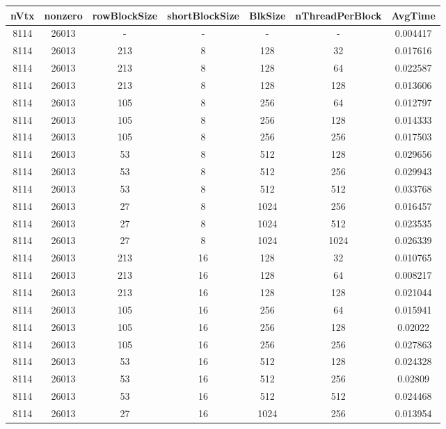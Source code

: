 \documentclass[9pt]{article}
\begin{document}
\SetBgPosition{0.25cm,-5.0cm}
\begin{tabular}{|c|c|c|c|c|c|c| }  
\hline
nVtx  & nonzero  & rowBlockSize  & shortBlockSize  & BlkSize  & nThreadPerBlock  & AvgTime \\
\hline
8114  & 26013  &  -  & -  & -  & -  &0.004417 \\
\hline
8114  & 26013  & 213  & 8  & 128  & 32  & 0.017616 \\
\hline
8114  & 26013  & 213  & 8  & 128  & 64  & 0.022587 \\
\hline
8114  & 26013  & 213  & 8  & 128  & 128  & 0.013606 \\
\hline
8114  & 26013  & 105  & 8  & 256  & 64  & 0.012797 \\
\hline
8114  & 26013  & 105  & 8  & 256  & 128  & 0.014333 \\
\hline
8114  & 26013  & 105  & 8  & 256  & 256  & 0.017503 \\
\hline
8114  & 26013  & 53  & 8  & 512  & 128  & 0.029656 \\
\hline
8114  & 26013  & 53  & 8  & 512  & 256  & 0.029943 \\
\hline
8114  & 26013  & 53  & 8  & 512  & 512  & 0.033768 \\
\hline
8114  & 26013  & 27  & 8  & 1024  & 256  & 0.016457 \\
\hline
8114  & 26013  & 27  & 8  & 1024  & 512  & 0.023535 \\
\hline
8114  & 26013  & 27  & 8  & 1024  & 1024  & 0.026339 \\
\hline
8114  & 26013  & 213  & 16  & 128  & 32  & 0.010765 \\
\hline
8114  & 26013  & 213  & 16  & 128  & 64  & 0.008217 \\
\hline
8114  & 26013  & 213  & 16  & 128  & 128  & 0.021044 \\
\hline
8114  & 26013  & 105  & 16  & 256  & 64  & 0.015941 \\
\hline
8114  & 26013  & 105  & 16  & 256  & 128  & 0.02022 \\
\hline
8114  & 26013  & 105  & 16  & 256  & 256  & 0.027863 \\
\hline
8114  & 26013  & 53  & 16  & 512  & 128  & 0.024328 \\
\hline
8114  & 26013  & 53  & 16  & 512  & 256  & 0.02809 \\
\hline
8114  & 26013  & 53  & 16  & 512  & 512  & 0.024468 \\
\hline
8114  & 26013  & 27  & 16  & 1024  & 256  & 0.013954 \\

\end{tabular}
\end{document}
